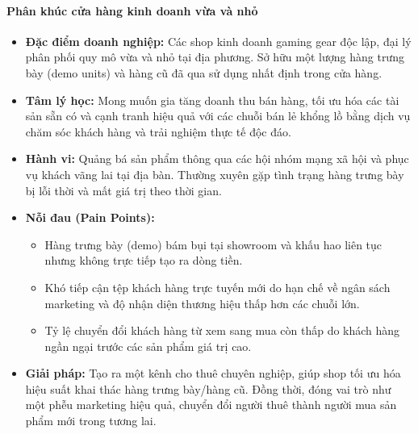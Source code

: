 \paragraph{Phân khúc cửa hàng kinh doanh vừa và nhỏ}
\begin{itemize}
    \item \textbf{Đặc điểm doanh nghiệp:} Các shop kinh doanh gaming gear độc lập, đại lý phân phối quy mô vừa và nhỏ tại địa phương. Sở hữu một lượng hàng trưng bày (demo units) và hàng cũ đã qua sử dụng nhất định trong cửa hàng.
    \item \textbf{Tâm lý học:} Mong muốn gia tăng doanh thu bán hàng, tối ưu hóa các tài sản sẵn có và cạnh tranh hiệu quả với các chuỗi bán lẻ khổng lồ bằng dịch vụ chăm sóc khách hàng và trải nghiệm thực tế độc đáo.
    \item \textbf{Hành vi:} Quảng bá sản phẩm thông qua các hội nhóm mạng xã hội và phục vụ khách vãng lai tại địa bàn. Thường xuyên gặp tình trạng hàng trưng bày bị lỗi thời và mất giá trị theo thời gian.
    \item \textbf{Nỗi đau (Pain Points):}
    \begin{itemize}
        \item Hàng trưng bày (demo) bám bụi tại showroom và khấu hao liên tục nhưng không trực tiếp tạo ra dòng tiền.
        \item Khó tiếp cận tệp khách hàng trực tuyến mới do hạn chế về ngân sách marketing và độ nhận diện thương hiệu thấp hơn các chuỗi lớn.
        \item Tỷ lệ chuyển đổi khách hàng từ xem sang mua còn thấp do khách hàng ngần ngại trước các sản phẩm giá trị cao.
    \end{itemize}
    \item \textbf{Giải pháp:} Tạo ra một kênh cho thuê chuyên nghiệp, giúp shop tối ưu hóa hiệu suất khai thác hàng trưng bày/hàng cũ. Đồng thời, đóng vai trò như một phễu marketing hiệu quả, chuyển đổi người thuê thành người mua sản phẩm mới trong tương lai.
\end{itemize}

